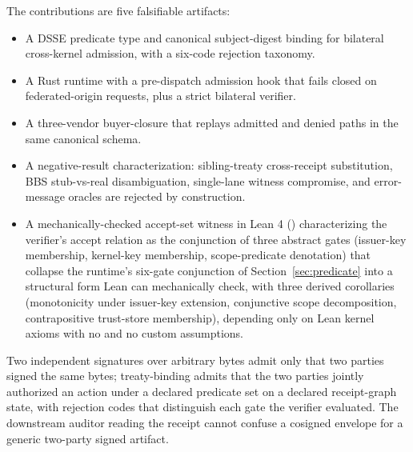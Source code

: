 The contributions are five falsifiable artifacts:

\begin{itemize}
  \item A DSSE predicate type and canonical subject-digest binding for bilateral cross-kernel admission, with a six-code rejection taxonomy.
  \item A Rust runtime with a pre-dispatch admission hook that fails closed on federated-origin requests, plus a strict bilateral verifier.
  \item A three-vendor buyer-closure that replays admitted and denied paths in the same canonical schema.
  \item A negative-result characterization: sibling-treaty cross-receipt substitution, BBS stub-vs-real disambiguation, single-lane witness compromise, and error-message oracles are rejected by construction.
  \item A mechanically-checked accept-set witness in Lean 4 () characterizing the verifier's accept relation as the conjunction of three abstract gates (issuer-key membership, kernel-key membership, scope-predicate denotation) that collapse the runtime's six-gate conjunction of Section~\ref{sec:predicate} into a structural form Lean can mechanically check, with three derived corollaries (monotonicity under issuer-key extension, conjunctive scope decomposition, contrapositive trust-store membership), depending only on Lean kernel axioms with no  and no custom assumptions.
\end{itemize}

Two independent signatures over arbitrary bytes admit only that two parties signed the same bytes; treaty-binding admits that the two parties jointly authorized an action under a declared predicate set on a declared receipt-graph state, with rejection codes that distinguish each gate the verifier evaluated. The downstream auditor reading the receipt cannot confuse a cosigned envelope for a generic two-party signed artifact.
